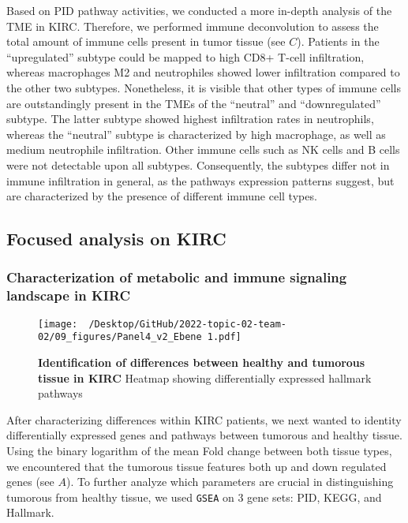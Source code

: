 \documentclass[
  parskip,
  oneside]{\documentclass[oneside]{book}}
\begin{document}
Based on PID pathway activities, we conducted a more in-depth analysis
of the TME in KIRC. Therefore, we performed immune deconvolution to
assess the total amount of immune cells present in tumor tissue (see
 \(C\)). Patients in the ``upregulated'' subtype could be
mapped to high CD8+ T-cell infiltration, whereas macrophages M2 and
neutrophiles showed lower infiltration compared to the other two
subtypes. Nonetheless, it is visible that other types of immune cells
are outstandingly present in the TMEs of the ``neutral'' and
``downregulated'' subtype. The latter subtype showed highest
infiltration rates in neutrophils, whereas the ``neutral'' subtype is
characterized by high macrophage, as well as medium neutrophile
infiltration. Other immune cells such as NK cells and B cells were not
detectable upon all subtypes. Consequently, the subtypes differ not in
immune infiltration in general, as the pathways expression patterns
suggest, but are characterized by the presence of different immune cell
types.

\hypertarget{focused-analysis-on-kirc}{%
\subsection{Focused analysis on KIRC}\label{focused-analysis-on-kirc}}

\hypertarget{characterization-of-metabolic-and-immune-signaling-landscape-in-kirc}{%
\subsubsection{Characterization of metabolic and immune signaling
landscape in
KIRC}\label{characterization-of-metabolic-and-immune-signaling-landscape-in-kirc}}

\begin{figure}[h]
 \begin{center}
   \texttt{[image: ~/Desktop/GitHub/2022-topic-02-team-02/09\_figures/Panel4\_v2\_Ebene 1.pdf]}
  \end{center}
  \caption{\textbf{Identification of differences between healthy and tumorous tissue in KIRC } Heatmap showing differentially expressed hallmark pathways}
  \label{volcano}
\end{figure}

After characterizing differences within KIRC patients, we next wanted to
identity differentially expressed genes and pathways between tumorous
and healthy tissue. Using the binary logarithm of the mean Fold change
between both tissue types, we encountered that the tumorous tissue
features both up and down regulated genes (see  \(A\)).
To further analyze which parameters are crucial in distinguishing
tumorous from healthy tissue, we used \texttt{GSEA} on 3 gene sets: PID,
KEGG, and Hallmark.
\end{document}
